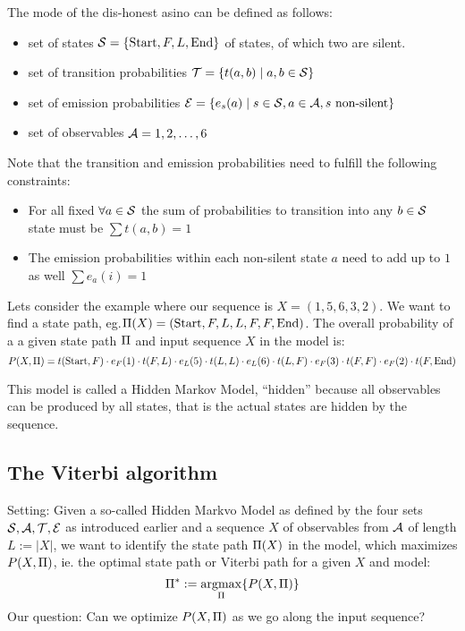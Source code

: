 The mode of the dis-honest asino can be defined as follows:
\begin{itemize}
\item set of states \(\mathcal{S}=\{\text{Start},F,L,\text{End}\}\) of states,
  of which two are silent.
\item set of transition probabilities
  \(\mathcal{T} = \{ t(a,b) \mid a,b\in\mathcal{S} \}\)
\item set of emission probabilities
  \(\mathcal{E} = \{ e_s(a) \mid s\in\mathcal{S}, a\in\mathcal{A}, s\text{ non-silent} \}\)
\item set of observables \(\mathcal{A} = {1,2,\dotsc,6}\)
\end{itemize}

Note that the transition and emission probabilities need to fulfill the
following constraints:
\begin{itemize}
\item For all fixed \(\forall a\in\mathcal{S}\) the sum of probabilities to
  transition into any \(b\in\mathcal{S}\) state must be \(\sum t(a,b) = 1\)
\item The emission probabilities within each non-silent state \(a\) need to add
  up to \(1\) as well
  \(\sum e_a(i) = 1\)
\end{itemize}

Lets consider the example where our sequence is \(X=(1,5,6,3,2)\).  We want to
find a state path, eg.\@ \(\Pi(X)=(\text{Start},F,L,L,F,F,\text{End})\).  The
overall probability of a a given state path \(\Pi\) and input sequence \(X\)
in the model is:
\[
    P(X,\Pi) = t(\text{Start},F) \cdot
                 e_F(1) \cdot t(F,L) \cdot
                 e_L(5) \cdot t(L,L) \cdot
                 e_L(6) \cdot t(L,F) \cdot
                 e_F(3) \cdot t(F,F) \cdot
                 e_F(2) \cdot t(F,\text{End})
\]

This model is called a Hidden Markov Model, \enquote{hidden} because all
observables can be produced by all states, that is the actual states are
hidden by the sequence.

\subsection{The Viterbi algorithm}

Setting: Given a so-called Hidden Markvo Model as defined by the four sets
\(\mathcal{S},\mathcal{A},\mathcal{T},\mathcal{E}\) as introduced earlier and a sequence \(X\)
of observables from \(\mathcal{A}\) of length \(L := |X|\), we want to identify the
state path \(\Pi(X)\) in the model, which maximizes \(P(X,\Pi)\), ie.\@
the optimal state path or Viterbi path for a given \(X\) and model:
\[
    \Pi^* := \operatorname*{argmax}_{\Pi} \{ P(X,\Pi) \}
\]
Our question: Can we optimize \(P(X,\Pi)\) as we go along the input sequence?

